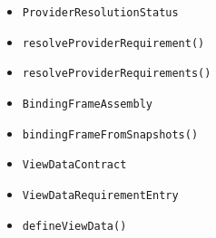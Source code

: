 \begin{itemize}
\item
  \texttt{P\allowbreak{}r\allowbreak{}o\allowbreak{}v\allowbreak{}i\allowbreak{}d\allowbreak{}e\allowbreak{}r\allowbreak{}R\allowbreak{}e\allowbreak{}s\allowbreak{}o\allowbreak{}l\allowbreak{}u\allowbreak{}t\allowbreak{}i\allowbreak{}o\allowbreak{}n\allowbreak{}S\allowbreak{}t\allowbreak{}a\allowbreak{}t\allowbreak{}u\allowbreak{}s}
\item
  \texttt{r\allowbreak{}e\allowbreak{}s\allowbreak{}o\allowbreak{}l\allowbreak{}v\allowbreak{}e\allowbreak{}P\allowbreak{}r\allowbreak{}o\allowbreak{}v\allowbreak{}i\allowbreak{}d\allowbreak{}e\allowbreak{}r\allowbreak{}R\allowbreak{}e\allowbreak{}q\allowbreak{}u\allowbreak{}i\allowbreak{}r\allowbreak{}e\allowbreak{}m\allowbreak{}e\allowbreak{}n\allowbreak{}t\allowbreak{}(\allowbreak{})}
\item
  \texttt{r\allowbreak{}e\allowbreak{}s\allowbreak{}o\allowbreak{}l\allowbreak{}v\allowbreak{}e\allowbreak{}P\allowbreak{}r\allowbreak{}o\allowbreak{}v\allowbreak{}i\allowbreak{}d\allowbreak{}e\allowbreak{}r\allowbreak{}R\allowbreak{}e\allowbreak{}q\allowbreak{}u\allowbreak{}i\allowbreak{}r\allowbreak{}e\allowbreak{}m\allowbreak{}e\allowbreak{}n\allowbreak{}t\allowbreak{}s\allowbreak{}(\allowbreak{})}
\item
  \texttt{B\allowbreak{}i\allowbreak{}n\allowbreak{}d\allowbreak{}i\allowbreak{}n\allowbreak{}g\allowbreak{}F\allowbreak{}r\allowbreak{}a\allowbreak{}m\allowbreak{}e\allowbreak{}A\allowbreak{}s\allowbreak{}s\allowbreak{}e\allowbreak{}m\allowbreak{}b\allowbreak{}l\allowbreak{}y}
\item
  \texttt{b\allowbreak{}i\allowbreak{}n\allowbreak{}d\allowbreak{}i\allowbreak{}n\allowbreak{}g\allowbreak{}F\allowbreak{}r\allowbreak{}a\allowbreak{}m\allowbreak{}e\allowbreak{}F\allowbreak{}r\allowbreak{}o\allowbreak{}m\allowbreak{}S\allowbreak{}n\allowbreak{}a\allowbreak{}p\allowbreak{}s\allowbreak{}h\allowbreak{}o\allowbreak{}t\allowbreak{}s\allowbreak{}(\allowbreak{})}
\item
  \texttt{V\allowbreak{}i\allowbreak{}e\allowbreak{}w\allowbreak{}D\allowbreak{}a\allowbreak{}t\allowbreak{}a\allowbreak{}C\allowbreak{}o\allowbreak{}n\allowbreak{}t\allowbreak{}r\allowbreak{}a\allowbreak{}c\allowbreak{}t}
\item
  \texttt{V\allowbreak{}i\allowbreak{}e\allowbreak{}w\allowbreak{}D\allowbreak{}a\allowbreak{}t\allowbreak{}a\allowbreak{}R\allowbreak{}e\allowbreak{}q\allowbreak{}u\allowbreak{}i\allowbreak{}r\allowbreak{}e\allowbreak{}m\allowbreak{}e\allowbreak{}n\allowbreak{}t\allowbreak{}E\allowbreak{}n\allowbreak{}t\allowbreak{}r\allowbreak{}y}
\item
  \texttt{d\allowbreak{}e\allowbreak{}f\allowbreak{}i\allowbreak{}n\allowbreak{}e\allowbreak{}V\allowbreak{}i\allowbreak{}e\allowbreak{}w\allowbreak{}D\allowbreak{}a\allowbreak{}t\allowbreak{}a\allowbreak{}(\allowbreak{})}
\end{itemize}

